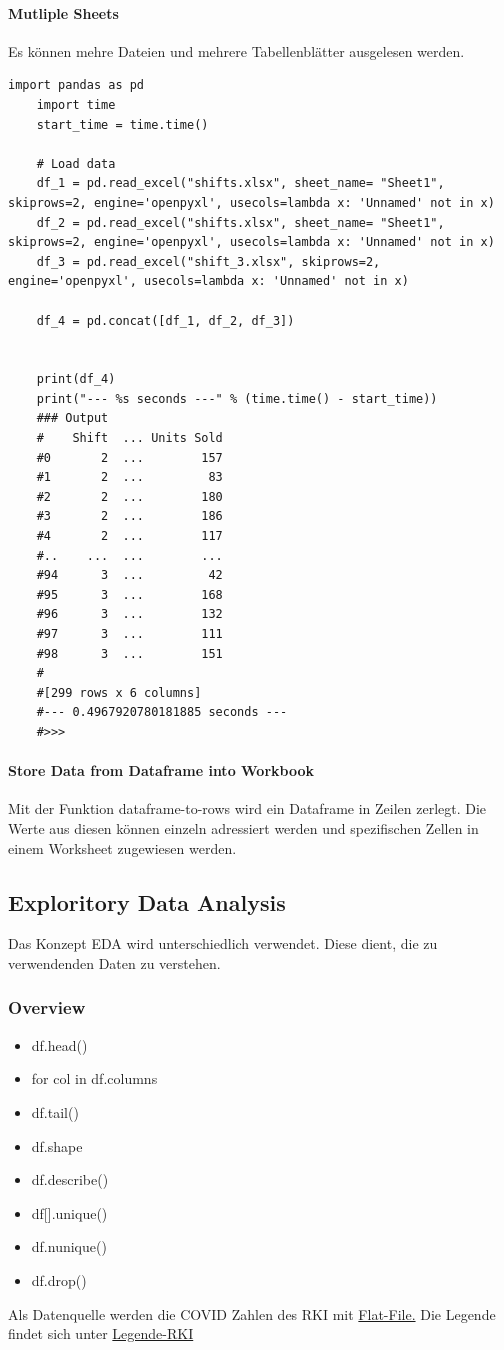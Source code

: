 \paragraph{Mutliple Sheets}
Es können mehre Dateien und mehrere Tabellenblätter ausgelesen werden.
\begin{lstlisting}[style= python]
	import pandas as pd
	import time
	start_time = time.time()
	
	# Load data
	df_1 = pd.read_excel("shifts.xlsx", sheet_name= "Sheet1", skiprows=2, engine='openpyxl', usecols=lambda x: 'Unnamed' not in x)
	df_2 = pd.read_excel("shifts.xlsx", sheet_name= "Sheet1", skiprows=2, engine='openpyxl', usecols=lambda x: 'Unnamed' not in x)
	df_3 = pd.read_excel("shift_3.xlsx", skiprows=2, engine='openpyxl', usecols=lambda x: 'Unnamed' not in x)
	
	df_4 = pd.concat([df_1, df_2, df_3])
	
	
	print(df_4)
	print("--- %s seconds ---" % (time.time() - start_time))
	### Output
	#    Shift  ... Units Sold
	#0       2  ...        157
	#1       2  ...         83
	#2       2  ...        180
	#3       2  ...        186
	#4       2  ...        117
	#..    ...  ...        ...
	#94      3  ...         42
	#95      3  ...        168
	#96      3  ...        132
	#97      3  ...        111
	#98      3  ...        151
	#
	#[299 rows x 6 columns]
	#--- 0.4967920780181885 seconds ---
	#>>> 
\end{lstlisting}
\paragraph{Store Data from Dataframe into Workbook}
Mit der Funktion dataframe-to-rows wird ein Dataframe in Zeilen zerlegt. Die Werte aus diesen können einzeln adressiert werden und spezifischen Zellen in einem Worksheet zugewiesen werden.

\subsection{Exploritory Data Analysis}

Das Konzept \gls{EDA} wird unterschiedlich verwendet. Diese dient, die zu verwendenden Daten zu verstehen.

\subsubsection{Overview} 
\begin{itemize}
	\item df.head()
	\item for col in df.columns
	\item df.tail()
	\item df.shape
	\item df.describe()
	\item df[].unique()
	\item df.nunique()
	\item df.drop()
\end{itemize}
Als Datenquelle werden die COVID Zahlen des \gls{RKI} mit \href{https://npgeo-corona-npgeo-de.hub.arcgis.com/datasets/dd4580c810204019a7b8eb3e0b329dd6_0}{Flat-File.}
Die Legende findet sich unter \href{https://npgeo-corona-npgeo-de.hub.arcgis.com/datasets/dd4580c810204019a7b8eb3e0b329dd6_0}{Legende-RKI}
